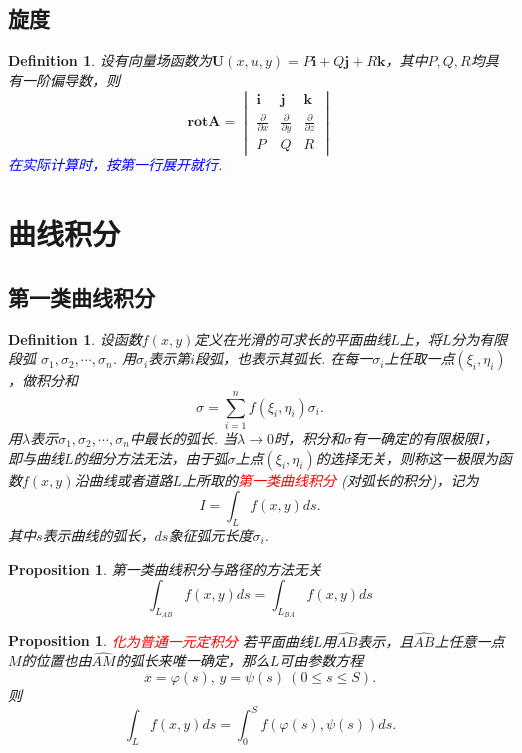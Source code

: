 \documentclass{article}
\newcommand{\mbf}[1]{\bm{#1}}
\newtheorem{proposition}[theorem]{Proposition}
\newtheorem{definition}[theorem]{Definition}
\newcommand{\redt}[1]{\textcolor{red}{#1}}
\newcommand{\bluet}[1]{\textcolor{blue}{#1}}
\begin{document}
\subsection{旋度}

\begin{definition}
\rm 设有向量场函数为$\mbf{U}(x,u,y)=P\mbf{i}+Q\mbf{j}+R\mbf{k}$，其中$P,Q,R$均具有一阶偏导数，则
$$
\textbf{rot}\mbf{A} = \begin{vmatrix}
\mbf{i} & \mbf{j} & \mbf{k} \\
\frac{\partial }{\partial x} & \frac{\partial }{\partial y} & \frac{\partial }{\partial z} \\
P & Q & R
\end{vmatrix}
$$
\bluet{在实际计算时，按第一行展开就行}. 
\end{definition}

\newpage
\section{曲线积分}

\subsection{第一类曲线积分}
\begin{definition}
\rm 设函数$f(x,y)$定义在光滑的可求长的平面曲线$L$上，将$L$分为有限段弧
$\sigma_1,\sigma_2,\cdots,\sigma_n$. 用$\sigma_i$表示第$i$段弧，也表示其弧长. 在每一$\sigma_i$上任取一点$(\xi_i,\eta_i)$，做积分和
$$
\sigma = \sum\limits_{i = 1}^n f(\xi_i,\eta_i)\sigma_i.
$$
用$\lambda$表示$\sigma_1,\sigma_2,\cdots,\sigma_n$中最长的弧长. 当$\lambda \to 0$时，积分和$\sigma$有一确定的有限极限$I$，即与曲线$L$的细分方法无法，由于弧$\sigma$上点$(\xi_i,\eta_i)$的选择无关，则称这一极限为函数$f(x,y)$沿曲线或者道路$L$上所取的\redt{第一类曲线积分}
(对弧长的积分)，记为
$$
I = \int_L f(x,y)ds. 
$$
其中$s$表示曲线的弧长，$ds$象征弧元长度$\sigma_i$.
\end{definition}

\begin{proposition}
\rm 第一类曲线积分与路径的方法无关
$$
\int_{L_{AB}} f(x,y)ds = \int_{L_{BA}} f(x,y)ds
$$
\end{proposition}


\begin{proposition}
\rm \redt{化为普通一元定积分} 若平面曲线$L$用$\widehat{AB}$表示，且$\widehat{AB}$上任意一点$M$的位置也由$\widehat{AM}$的弧长来唯一确定，那么$L$可由参数方程
$$
x = \varphi(s), \, y = \psi(s) ~ (0 \leq s \leq S).
$$
则
$$
\int_L f(x,y)ds = \int_{0}^S f(\varphi(s),\psi(s))ds.
$$
\end{proposition}
\end{document}
